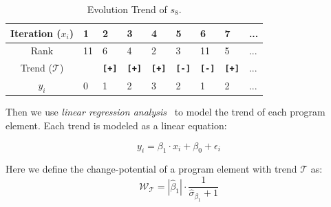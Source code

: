 \begin{table}[!h]
	\centering
	\caption{Evolution Trend of $s_8$.}
	\renewcommand{\arraystretch}{1.5}
	\begin{tabular}{cCCCCCCCC}
		\hline
		Iteration ($x_{i}$) &1 &2 &3 &4 &5 &6 &7 &... \\
		\hline\hline
		Rank &11 & 6 & 4 &2 &3 &11 & 5 & ... \\
		Trend ($\mathcal{T}$) & {\bf}&{\bf\texttt{[+]}}&{\bf\texttt{[+]}}&{\bf\texttt{[+]}}&{\bf\texttt{[-]}}&{\bf\texttt{[-]}}&{\bf\texttt{[+]}}&... \\
		$y_{i}$ & 0 & 1 & 2 & 3 & 2 & 1 & 2 & ... \\
		\hline
	\end{tabular}
    \label{tab:trend_example}
\end{table}


\vspace{0.2cm}
 Then we use {\em linear regression analysis}~\citep{GrIy94} to model the trend of each program element. Each trend is modeled as a linear equation:

\begin{equation}
	y_{i}=\beta_{1}\cdot x_{i} + \beta_{0} + \epsilon_{i}
\end{equation}

\vspace{0.2cm}
 Here we define the change-potential of a program element with trend $\mathcal{T}$ as:
\begin{equation}
	\mathcal{W}_\mathcal{T} =  \left| \hat{\beta}_{1} \right| \cdot \frac{1}{\hat{\sigma}_{\beta_{1}}+1}\label{eq:trend_metric}
\end{equation}


